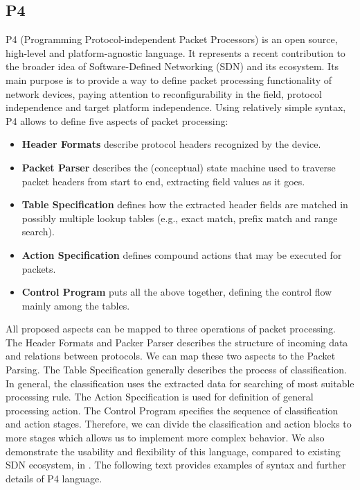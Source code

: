\subsection{P4}
\label{sec:p4Language}
% 
P4 (Programming Protocol-independent Packet Processors) \cite{p4,p4web} is an open source, high-level and platform-agnostic language.
It represents a recent contribution to the broader idea of Software-Defined Networking (SDN) and its ecosystem. 
Its main purpose is to provide a way to define packet processing functionality of network devices, paying attention to reconfigurability in the field,
protocol independence and target platform independence. Using relatively simple syntax, P4 allows to define five aspects of packet processing:
\begin{itemize}
\item \textbf{Header Formats} describe protocol headers recognized by the device.
\item \textbf{Packet Parser} describes the (conceptual) state machine used to traverse packet headers from start to end, extracting field values 
as it goes.
\item \textbf{Table Specification} defines how the extracted header fields are matched in possibly multiple lookup tables 
(e.g., exact match, prefix match and range search).
\item \textbf{Action Specification} defines compound actions that may be executed for packets.
\item \textbf{Control Program} puts all the above together, defining the control flow mainly among the tables.
\end{itemize}

All proposed aspects can be mapped to three operations of packet processing. The Header Formats and Packer Parser describes the structure 
of incoming data and relations between protocols. 
We can map these two aspects to the Packet Parsing. The Table Specification generally describes the process of classification. 
In general, the classification uses the extracted data for searching of most suitable processing rule. 
The Action Specification is used for definition of general processing action.
The Control Program specifies the sequence of classification and action stages. 
Therefore, we can divide the classification and action blocks to more stages which allows us to implement more complex behavior. 
We also demonstrate the usability and flexibility of this language, compared to existing SDN ecosystem, in \cite{2016cesnet-p4,2016root-p4}.
The following text provides examples of syntax and further details of P4 language.

